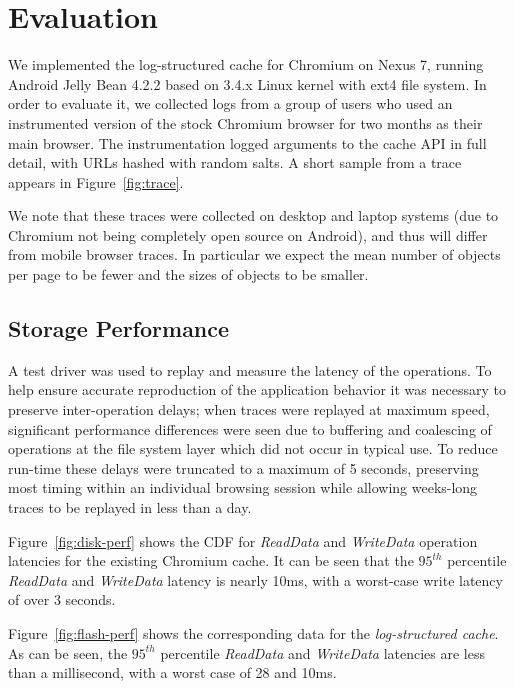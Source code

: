 \documentclass[letterpaper,twocolumn,10pt]{article}
\begin{document}
\section{Evaluation}

We implemented the log-structured cache for Chromium on Nexus 7, running Android
Jelly Bean 4.2.2 based on 3.4.x Linux kernel with ext4 file system.  In order to
evaluate it, we collected logs from a group of users who used an instrumented
version of the stock Chromium browser for two months as their main browser.  The
instrumentation logged arguments to the cache API in full detail, with URLs
hashed with random salts.  A short sample from a trace appears in
Figure~\ref{fig:trace}.

We note that these traces were collected on desktop and laptop systems (due to
Chromium not being completely open source on Android), and thus will differ from
mobile browser traces. In particular we expect the mean number of objects per
page to be fewer and the sizes of objects to be smaller.

\subsection{Storage Performance}

A test driver was used to replay and measure the latency of the operations. To
help ensure accurate reproduction of the application behavior it was
necessary to preserve inter-operation delays; when traces were
replayed at maximum speed, significant performance differences were
seen due to buffering and coalescing of operations at the file system
layer which did not occur in typical use. To reduce run-time these
delays were truncated to a maximum of 5 seconds, preserving most timing
within an individual browsing session while allowing weeks-long traces
to be replayed in less than a day.

Figure~\ref{fig:disk-perf} shows the CDF for \emph{ReadData} and
\emph{WriteData} operation latencies for the existing Chromium cache.  It can be
seen that the $95^{th}$ percentile \emph{ReadData} and \emph{WriteData} latency
is nearly 10ms, with a worst-case write latency of over 3 seconds.

Figure~\ref{fig:flash-perf} shows the corresponding data for the
\emph{log-structured cache}.  As can be seen, the $95^{th}$ percentile
\emph{ReadData} and \emph{WriteData} latencies are less than a millisecond, with
a worst case of 28 and 10ms.
\end{document}
